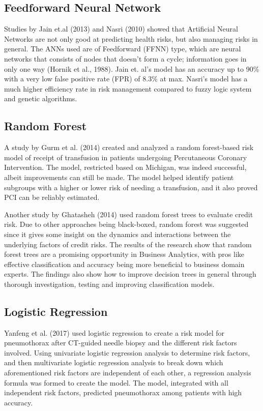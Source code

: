 \documentclass[10pt,11pt,12pt,oneside]{book}
\begin{document}
        \subsection{Feedforward Neural Network}
        Studies by Jain et.al (2013) and Nasri (2010) showed that Artificial Neural Networks are not only good at predicting health risks, but also managing risks in general. The ANNs used are of Feedforward (FFNN) type, which are neural networks that consists of nodes that doesn’t form a cycle; information goes in only one way (Hornik et al., 1988). Jain et. al’s model has an accuracy up to 90\% with a very low false positive rate (FPR) of 8.3\% at max. Nasri’s model has a much higher efficiency rate in risk management compared to fuzzy logic system and genetic algorithms. \cite{jain_singh_2013, nasri2010application}

        \subsection{Random Forest}
        A study by Gurm et al. (2014) created and analyzed a random forest-based risk model of receipt of transfusion in patients undergoing Percutaneous Coronary Intervention. The model, restricted based on Michigan, was indeed successful, albeit improvements can still be made. The model helped identify patient subgroups with a higher or lower risk of needing a transfusion, and it also proved PCI can be reliably estimated. \cite{Gurm2014}

        Another study by Ghatasheh (2014) used random forest trees to evaluate credit risk. Due to other approaches being black-boxed, random forest was suggested since it gives some insight on the dynamics and interactions between the underlying factors of credit risks. The results of the research show that random forest trees are a promising opportunity in Business Analytics, with pros like effective classification and accuracy being more beneficial to business domain experts. The findings also show how to improve decision trees in general through thorough investigation, testing and improving classification models. \cite{Ghatasheh2014BusinessAU}
        \subsection{Logistic Regression}
        Yanfeng et al. (2017) used logistic regression to create a risk model for pneumothorax after CT-guided needle biopsy and the different risk factors involved. Using univariate logistic regression analysis to determine risk factors, and then multivariate logistic regression analysis to break down which aforementioned risk factors are independent of each other, a regression analysis formula was formed to create the model. The model, integrated with all independent risk factors, predicted pneumothorax among patients with high accuracy. \cite{Zhao2017}
\end{document}
